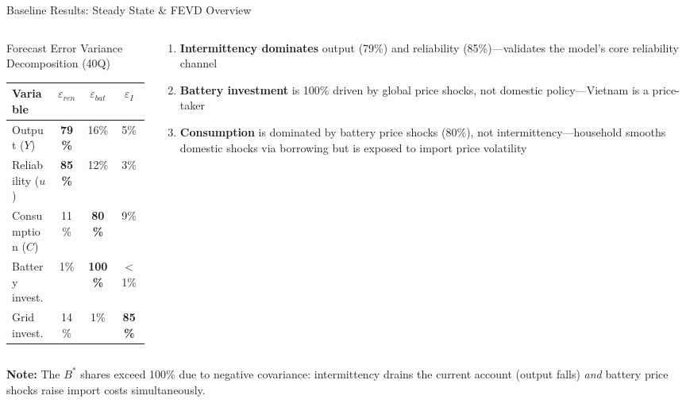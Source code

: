 \documentclass[aspectratio=169,10pt]{beamer}
\newcommand{\fuvhl}[1]{\textcolor{fuvteal}{\textbf{#1}}}
\newcommand{\fuvwarn}[1]{\textcolor{fuvred}{\textbf{#1}}}
\begin{document}
\begin{frame}{Baseline Results: Steady State \& FEVD Overview}
	\begin{columns}[T]
		\begin{column}{0.47\textwidth}
			\begin{block}{Forecast Error Variance Decomposition (40Q)}
				\centering\small
				\renewcommand{\arraystretch}{1.2}
				\begin{tabular}{@{}lccc@{}}
					\toprule
					\textbf{Variable} & $\varepsilon_{ren}$ & $\varepsilon_{bat}$ & $\varepsilon_I$\\
					\midrule
					Output ($Y$)        & \fuvwarn{79\%} & 16\% & 5\%\\
					Reliability ($u$)   & \fuvwarn{85\%} & 12\% & 3\%\\
					Consumption ($C$)   & 11\% & \fuvwarn{80\%} & 9\%\\
					Battery invest.     & 1\%  & \fuvwarn{100\%}& $<$1\%\\
					Grid invest.        & 14\% & 1\%  & \fuvwarn{85\%}\\
					\bottomrule
				\end{tabular}
			\end{block}
		\end{column}
		\begin{column}{0.47\textwidth}
			\begin{keybox}[title=Three Structural Findings from FEVD]
				\begin{enumerate}\small
					\item \fuvhl{Intermittency dominates} output (79\%) and reliability (85\%)---validates the model's core reliability channel
					\item \fuvwarn{Battery investment} is 100\% driven by global price shocks, not domestic policy---Vietnam is a price-taker
					\item \fuvhl{Consumption} is dominated by battery price shocks (80\%), not intermittency---household smooths domestic shocks via borrowing but is exposed to import price volatility
				\end{enumerate}
			\end{keybox}
		\end{column}
	\end{columns}
	\vspace{0.3em}
	\begin{keybox}
		\small \textbf{Note:} The $B^*$ shares exceed 100\% due to negative covariance: intermittency drains the current account (output falls) \textit{and} battery price shocks raise import costs simultaneously.
	\end{keybox}
\end{frame}
\end{document}
